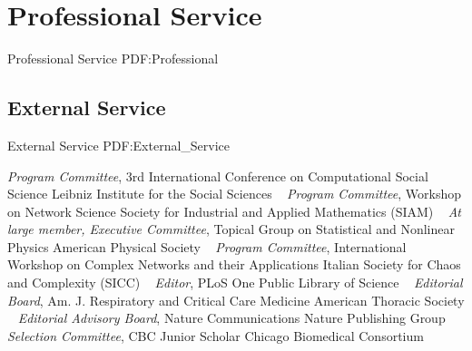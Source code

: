 \section
{Professional Service}
{Professional Service}
{PDF:Professional}

\subsection
{External Service}
{External Service}
{PDF:External_Service}

\GapNoBreak
{}
\textit{Program Committee}, 3rd International Conference on Computational Social Science\newline
Leibniz Institute for the Social Sciences \newline
~
\Gap
{}
\textit{Program Committee}, Workshop on Network Science\newline
Society for Industrial and Applied Mathematics (SIAM) \newline
~
\Gap
{}
\textit{At large member, Executive Committee}, Topical Group on Statistical and Nonlinear Physics\newline
American Physical Society \newline
~
\Gap
{}
\textit{Program Committee}, International Workshop on Complex Networks and their Applications\newline
Italian Society for Chaos and Complexity (SICC) \newline
~
\Gap
{}
\textit{Editor}, PLoS One\newline
Public Library of Science \newline
~
\Gap
{}
\textit{Editorial Board}, Am. J. Respiratory and Critical Care Medicine\newline
American Thoracic Society \newline
~
\Gap
{}
\textit{Editorial Advisory Board}, Nature Communications\newline
Nature Publishing Group \newline
~
\Gap
{}
\textit{Selection Committee}, CBC Junior Scholar\newline
Chicago Biomedical Consortium \newline
~
\Gap
{}
